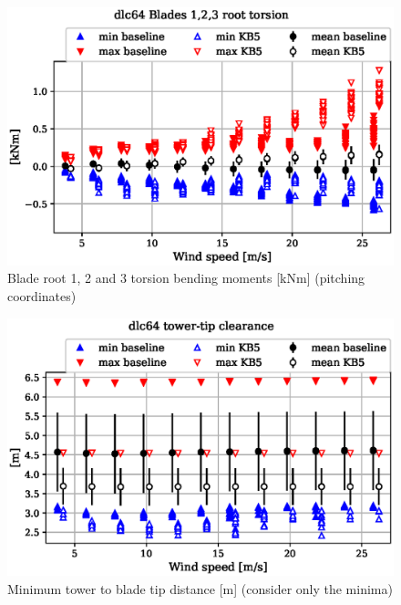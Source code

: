 \begin{figure}[!ht]
\begin{center}
	\includegraphics[width=.85\linewidth]{figures/baseline-vs-KB6/dlc64/blade1-blade1-node-001-momentvec-z_AA0008_AA0008.eps}
\end{center}
\caption{Blade root 1, 2 and 3 torsion bending moments [kNm] (pitching coordinates)}
\label{fig:baseline-vs-KB6:dlc64:blade-root-torsion}
\end{figure}

\begin{figure}[!ht]
\begin{center}
	\includegraphics[width=.85\linewidth]{figures/baseline-vs-KB6/dlc64/DLL-towerclearance_mblade-inpvec-1_AA0008_AA0008.eps}
\end{center}
\caption{Minimum tower to blade tip distance [m] (consider only the minima)}
\label{fig:baseline-vs-KB6:dlc64:tower-tip-clearance}
\end{figure}

